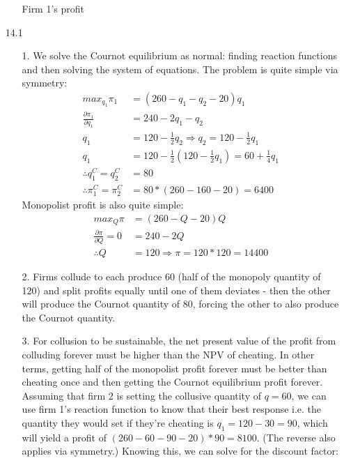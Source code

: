 \documentclass[12pt,letterpaper]{article}
\begin{document}
\begin{enumerate}
\begin{enumerate}
	Firm 1's profit 
\end{enumerate} 

\item[14.1]
\begin{enumerate}
	\item[1.] We solve the Cournot equilibrium as normal: finding reaction functions and then solving the system of equations. The problem is quite simple via symmetry:
	\begin{align*}
		max_{q_1} \pi_1 &= (260 - q_1 - q_2 - 20) q_1 \\
		\frac{\partial\pi_1}{\partial q_1} &= 240 - 2q_1 - q_2 \\
		q_1 &= 120 - \frac{1}{2}q_2 \Rightarrow q_2 = 120 - \frac{1}{2}q_1 \\
		q_1 &= 120 - \frac{1}{2}(120 - \frac{1}{2}q_1) = 60 + \frac{1}{4}q_1 \\
		\therefore q_1^C = q_2^C &= 80 \\
		\therefore \pi_1^C = \pi_2^C &= 80 * (260 - 160 - 20) = 6400
	\end{align*}
	Monopolist profit is also quite simple:
	\begin{align*}
		max_Q \pi &= (260 - Q - 20) Q \\
		\frac{\partial\pi}{\partial Q}= 0 &= 240 - 2Q \\
		\therefore Q &= 120 \Rightarrow \pi = 120 * 120 = 14400
	\end{align*}
	\item[2.] Firms collude to each produce 60 (half of the monopoly quantity of 120) and split profits equally until one of them deviates - then the other will produce the Cournot quantity of 80, forcing the other to also produce the Cournot quantity.
	\item[3.] For collusion to be sustainable, the net present value of the profit from colluding forever must be higher than the NPV of cheating. In other terms, getting half of the monopolist profit forever must be better than cheating once and then getting the Cournot equilibrium profit forever. Assuming that firm 2 is setting the collusive quantity of $q=60$, we can use firm 1's reaction function to know that their best response i.e. the quantity they would set if they're cheating is $q_1 = 120-30 = 90$, which will yield a profit of $(260 - 60 - 90 - 20)*90 = 8100$. (The reverse also applies via symmetry.) Knowing this, we can solve for the discount factor: 

\end{enumerate}
\end{enumerate}
\end{document}
